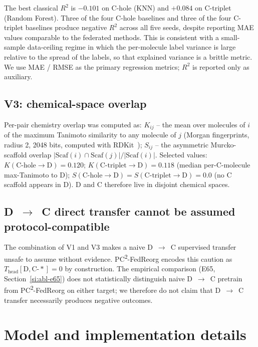 \documentclass[11pt,a4paper]{article}
\newcommand{\PC}{PC\textsuperscript{2}-FedReorg}
\begin{document}
The best classical $R^2$ is $-0.101$ on C-hole (KNN) and $+0.084$ on C-triplet (Random Forest). Three of the four C-hole baselines and three of the four C-triplet baselines produce negative $R^2$ across all five seeds, despite reporting MAE values comparable to the federated methods. This is consistent with a small-sample data-ceiling regime in which the per-molecule label variance is large relative to the spread of the labels, so that explained variance is a brittle metric. We use MAE / RMSE as the primary regression metrics; $R^2$ is reported only as auxiliary.

\subsection{V3: chemical-space overlap}
Per-pair chemistry overlap was computed as: \textbf{$K_{ij}$} -- the mean over molecules of $i$ of the maximum Tanimoto similarity to any molecule of $j$ (Morgan fingerprints, radius 2, 2048 bits, computed with RDKit~\citep{RDKit2023}); \textbf{$S_{ij}$} -- the asymmetric Murcko-scaffold overlap $|\mathrm{Scaf}(i) \cap \mathrm{Scaf}(j)| / |\mathrm{Scaf}(i)|$. Selected values: $K(\mathrm{C\text{-}hole} \to \mathrm{D}) = 0.120$; $K(\mathrm{C\text{-}triplet} \to \mathrm{D}) = 0.118$ (median per-C-molecule max-Tanimoto to D); $S(\mathrm{C\text{-}hole} \to \mathrm{D}) = S(\mathrm{C\text{-}triplet} \to \mathrm{D}) = 0.0$ (no C scaffold appears in D). D and C therefore live in disjoint chemical spaces.

\subsection{D~$\to$~C direct transfer cannot be assumed protocol-compatible}
The combination of V1 and V3 makes a naive D~$\to$~C supervised transfer unsafe to assume without evidence. \PC{} encodes this caution as $T_{\mathrm{head}}[\mathrm{D}, \mathrm{C\text{-}*}] = 0$ by construction. The empirical comparison (E65, Section~\ref{si:abl-e65}) does not statistically distinguish naive D~$\to$~C pretrain from \PC{} on either target; we therefore do not claim that D~$\to$~C transfer necessarily produces negative outcomes.

\section{Model and implementation details}\label{si:impl}
\end{document}
